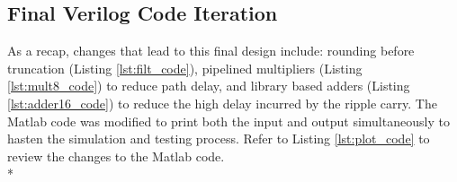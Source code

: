 \subsection*{Final Verilog Code Iteration}
As a recap, changes that lead to this final design include: rounding before truncation (Listing \ref{lst:filt_code}), pipelined multipliers (Listing \ref{lst:mult8_code}) to reduce path delay, and library based adders (Listing \ref{lst:adder16_code}) to reduce the high delay incurred by the ripple carry. The Matlab code was modified to print both the input and output simultaneously to hasten the simulation and testing process. Refer to Listing \ref{lst:plot_code} to review the changes to the Matlab code.
\\*
\lstset{language=verilog}






\lstset{language=matlab}
